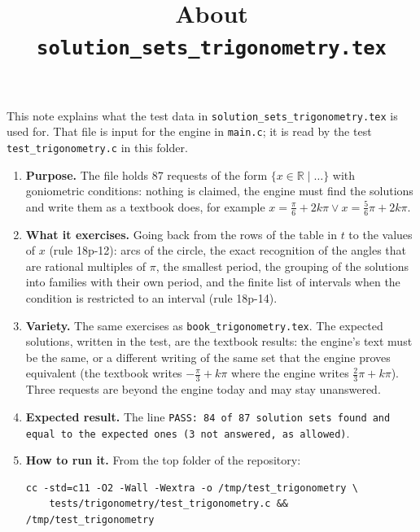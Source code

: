\documentclass[11pt,a4paper]{article}
\title{About \texttt{solution\_sets\_trigonometry.tex}}
\author{}
\date{}
\begin{document}
\maketitle
This note explains what the test data in \texttt{solution\_sets\_trigonometry.tex} is used for. That file is input for the engine in \texttt{main.c}; it is read by the test \texttt{test\_trigonometry.c} in this folder.

\begin{enumerate}
\item \textbf{Purpose.} The file holds 87 requests of the form $\{x \in \mathbb{R} \mid \ldots\}$ with goniometric conditions: nothing is claimed, the engine must find the solutions and write them as a textbook does, for example $x = \frac{\pi}{6} + 2k\pi \lor x = \frac{5}{6}\pi + 2k\pi$.

\item \textbf{What it exercises.} Going back from the rows of the table in $t$ to the values of $x$ (rule 18p-12): arcs of the circle, the exact recognition of the angles that are rational multiples of $\pi$, the smallest period, the grouping of the solutions into families with their own period, and the finite list of intervals when the condition is restricted to an interval (rule 18p-14).

\item \textbf{Variety.} The same exercises as \texttt{book\_trigonometry.tex}. The expected solutions, written in the test, are the textbook results: the engine's text must be the same, or a different writing of the same set that the engine proves equivalent (the textbook writes $-\frac{\pi}{3} + k\pi$ where the engine writes $\frac{2}{3}\pi + k\pi$). Three requests are beyond the engine today and may stay unanswered.

\item \textbf{Expected result.} The line \texttt{PASS: 84 of 87 solution sets found and equal to the expected ones (3 not answered, as allowed)}.

\item \textbf{How to run it.} From the top folder of the repository:
\begin{verbatim}
cc -std=c11 -O2 -Wall -Wextra -o /tmp/test_trigonometry \
    tests/trigonometry/test_trigonometry.c && /tmp/test_trigonometry
\end{verbatim}
\end{enumerate}
\end{document}
